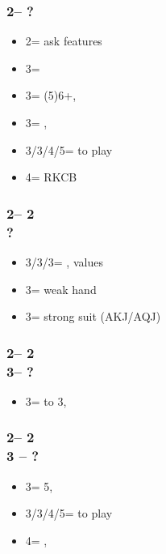 \documentclass[12pt, a4paper]{article}
\begin{document}
\subsubsection*{2\spades -- ?}
\begin{itemize}
    \item 2\nt = ask \nt features
    \item 3\clubs = \lsf
    \item 3\diams = (5)6+\hearts, \invp \vimp
    \item 3\hearts = \minor, \gf
    \item 3\spades/3\nt/4\major/5\minor = to play
    \item 4\clubs = RKCB
\end{itemize}

\subsubsection*{2\spades -- 2\nt\\
                ?}
\begin{itemize}
    \item 3\clubs/3\diams/3\hearts = \nat, \nt values
    \item 3\spades = weak hand
    \item 3\nt = strong suit (AKJ/AQJ)
\end{itemize}

\subsubsection*{2\spades -- 2\nt\\
                3\clubs -- ?}
\begin{itemize}
    \item 3\diams = \inv to 3\nt, \nat
\end{itemize}

\subsubsection*{2\spades -- 2\nt\\
                3 -- ?}
\begin{itemize}
    \item 3\hearts = 5\hearts, \fton{3\spades}
    \item 3\spades/3\nt/4\spades/5\minor = to play
    \item 4\nt = \inv, \nat
\end{itemize}
\end{document}
